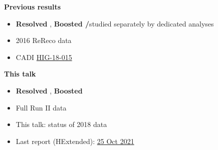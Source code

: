 {  \twoColumns
      {
        \small
        \hspace{1.5cm} \textbf{Previous results}
        \vspace{0.1cm}
        \begin{itemize}
        \item \textcolor{kDarkGreen}{\textbf{Resolved \PQt}},
          \textcolor{kBlue}{\textbf{Boosted \PW/\PQt}}\newline studied separately by dedicated analyses
        \item 2016 ReReco data
        \item CADI \href{https://cms.cern.ch/iCMS/analysisadmin/cadilines?line=HIG-18-015}{\textcolor{kBlue}{HIG-18-015}}
        \end{itemize}
      }
      {
        \small
        \hspace{2cm}  \textbf{This talk}
        \vspace{0.1cm}
        \begin{itemize}          
          \item \textcolor{kDarkGreen}{\textbf{Resolved \PQt}}, \textcolor{kBlue}{\textbf{Boosted \PQt}}
          \item Full Run II data
          \item This talk: status of 2018 data
          \item Last report (HExtended):
            \href{https://indico.cern.ch/event/1071752/contributions/4578521/attachments/2333742/3977531/HiggsExtended_MKolosova_25Oct2021.pdf}{\textcolor{kBlue}{25
            Oct 2021}}
        \end{itemize}        
      }
}

